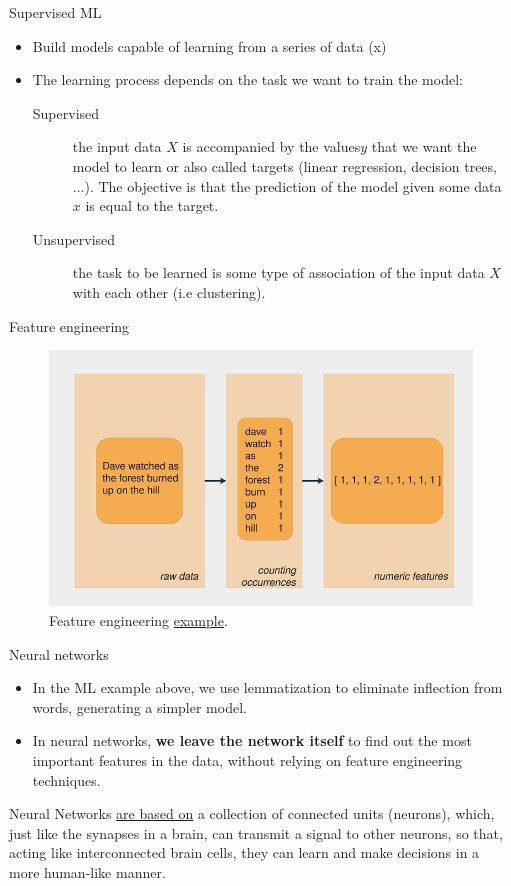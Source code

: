 \documentclass{beamer}
\begin{document}
\begin{frame}{Supervised ML}
    \begin{itemize}
        \item Build models capable of learning from a series of data (x)
        \item The learning process depends on the task we want to train the model:
            \begin{description}
                \item[Supervised] the input data $X$ is accompanied by the values ​$​y$ that we want the model to learn or also called targets (linear regression, decision trees, ...). The objective is that the prediction of the model given some data $x$ is equal to the target. 
                \item[Unsupervised] the task to be learned is some type of association of the input data $X$ with each other (i.e clustering).
            \end{description}
        \end{itemize}
\end{frame}


\begin{frame}{Feature engineering}
    \begin{figure}
        \includegraphics[width=0.9\linewidth]{FeatureEngineering}
        \caption{Feature engineering \href{https://realpython.com/python-ai-neural-network/}{example}.}
        \label{Fig:FeatureEngineering}
    \end{figure}
\end{frame}

\begin{frame}{Neural networks}
    \begin{itemize}
        \item In the ML example above, we use lemmatization to eliminate inflection from words, generating a simpler model.
        \item In neural networks, {\bf we leave the network itself} to find out the most important features in the data, without relying on feature engineering techniques. 
    \end{itemize}
    Neural Networks \href{https://towardsdatascience.com/deep-learning-with-python-neural-networks-complete-tutorial-6b53c0b06af0}{are based on} a collection of connected units (neurons), which, just like the synapses in a brain, can transmit a signal to other neurons, so that, acting like interconnected brain cells, they can learn and make decisions in a more human-like manner.
\end{frame}
\end{document}
